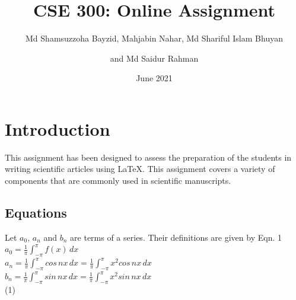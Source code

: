 \documentclass[18pt]{article}
\title{CSE 300: Online Assignment}
\author{Md Shamsuzzoha Bayzid, Mahjabin Nahar, Md Shariful Islam Bhuyan \and and Md Saidur Rahman }
\date{June 2021}
\begin{document}
\maketitle

\section{Introduction}
This assignment has been designed to assess the preparation of the students in writing scientific articles using \LaTeX. This assignment covers a variety of components that are commonly used in scientific manuscripts.

\subsection{Equations}
Let $a_0$, $a_n$ and $b_n$ are terms of a series. Their definitions are given by Eqn. 1\\

$a_0 = \frac{1}{\pi} \int_{-\pi}^{\pi} f(x)\,dx$\\

$a_n = \frac{1}{\pi} \int_{-\pi}^{\pi} cos\,nx\,dx = \frac{1}{\pi} \int_{-\pi}^{\pi} x^2 cos\,nx\,dx$\\

$b_n = \frac{1}{\pi} \int_{-\pi}^{\pi} sin\,nx\,dx = \frac{1}{\pi} \int_{-\pi}^{\pi} x^2 sin\,nx\,dx$ \\

\noindent (1)
\end{document}
